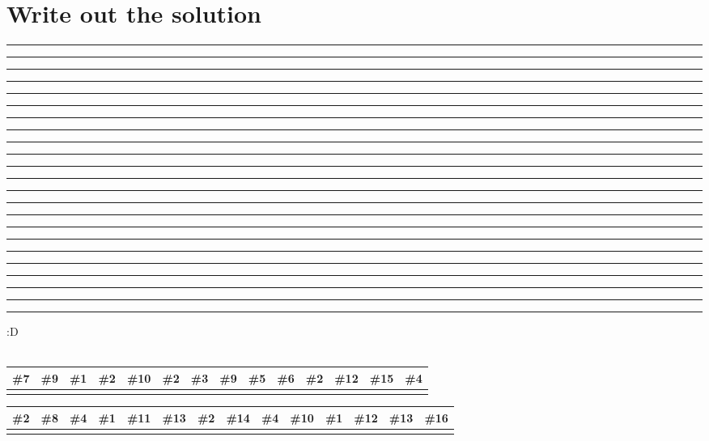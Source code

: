 \documentclass[12pt]{article}
\begin{document}
\vspace{1cm}
\setcounter{section}{2}
\section{Write out the solution}
\noindent 
\rule{0.4cm}{0.4pt} \rule{0.4cm}{0.4pt} \rule{0.4cm}{0.4pt} 
\quad 
\rule{0.4cm}{0.4pt} 
\quad 
\rule{0.4cm}{0.4pt} \rule{0.4cm}{0.4pt} \rule{0.4cm}{0.4pt} \rule{0.4cm}{0.4pt} 
\quad
\rule{0.4cm}{0.4pt} \rule{0.4cm}{0.4pt} \rule{0.4cm}{0.4pt}
\quad 
\rule{0.4cm}{0.4pt} \rule{0.4cm}{0.4pt} \rule{0.4cm}{0.4pt} \rule{0.4cm}{0.4pt} \rule{0.4cm}{0.4pt} 
\quad 
\rule{0.4cm}{0.4pt} \rule{0.4cm}{0.4pt} \rule{0.4cm}{0.4pt} \rule{0.4cm}{0.4pt} \rule{0.4cm}{0.4pt} \rule{0.4cm}{0.4pt} 
\quad 
\rule{0.4cm}{0.4pt} :D
\\\\
\noindent
\begin{tabular}{|*{14}{W|}}  %
\hline
\textbf{\#7} & \textbf{\#9} & \textbf{\#1} & \textbf{\#2} & 
\textbf{\#10} & \textbf{\#2} & \textbf{\#3} & \textbf{\#9} & 
\textbf{\#5} & \textbf{\#6} & \textbf{\#2} & 
\textbf{\#12} & \textbf{\#15} & \textbf{\#4} \\

\hline
& & & & & & & & & & & & & \\
\hline
\end{tabular}

\vspace{1em}

\noindent
\begin{tabular}{|*{14}{W|}}  %
\hline
\textbf{\#2} & \textbf{\#8} & \textbf{\#4} & \textbf{\#1} & \textbf{\#11} & 
\textbf{\#13} & \textbf{\#2} & \textbf{\#14} & \textbf{\#4} & 
\textbf{\#10} & \textbf{\#1} & \textbf{\#12} & 
\textbf{\#13} & \textbf{\#16} \\
\hline

& & & & & & & & & & & & & \\

\hline
\end{tabular}
\end{document}

